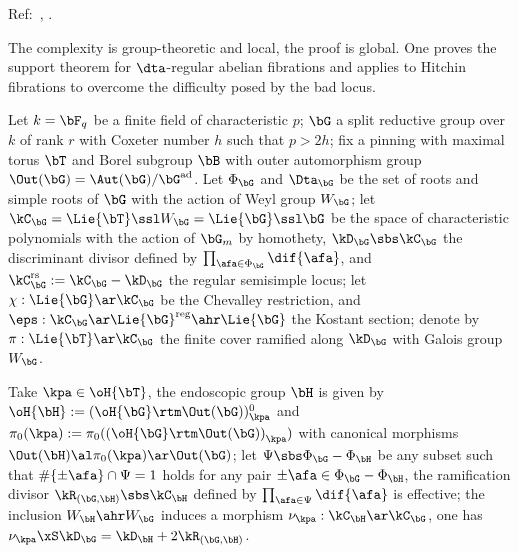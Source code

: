 \documentclass[article, a4paper, twoside]{universal}
\begin{document}
\confighead{}{}{}



Ref:~\cite{Ngo2010Lemme}, \cite{Ngo2006Hitchin,Yun2009Thesis}.

The complexity is group-theoretic and local, the proof is global. One proves the support theorem for $\dta$-regular abelian fibrations and applies to Hitchin fibrations to overcome the difficulty posed by the bad locus.




\begin{stp}
	Let $k=\bF_{q}$ be a finite field of characteristic $p$; $\bG$ a split reductive group over $k$ of rank $r$ with Coxeter number $h$ such that $p>2h$; fix a pinning with maximal torus $\bT$ and Borel subgroup $\bB$ with outer automorphism group $\Out(\bG)=\Aut(\bG)/\bG^{\text{ad}}$. Let $\Phi_{\bG}$ and $\Dta_{\bG}$ be the set of roots and simple roots of $\bG$ with the action of Weyl group $W_{\bG}$; let $\kC_{\bG}=\Lie{\bT}\ssl W_{\bG}=\Lie{\bG}\ssl\bG$ be the space of characteristic polynomials with the action of $\bG_{m}$ by homothety, $\kD_{\bG}\sbs\kC_{\bG}$ the discriminant divisor defined by $\prod_{\afa\in\Phi_{\bG}}\dif{\afa}$, and $\kC_{\bG}^{\text{rs}}:=\kC_{\bG}-\kD_{\bG}$ the regular semisimple locus; let $\chi:\Lie{\bG}\ar\kC_{\bG}$ be the Chevalley restriction, and $\eps:\kC_{\bG}\ar\Lie{\bG}^{\text{reg}}\ahr\Lie{\bG}$ the Kostant section; denote by $\pi:\Lie{\bT}\ar\kC_{\bG}$ the finite cover ramified along $\kD_{\bG}$ with Galois group $W_{\bG}$.

	Take $\kpa\in\oH{\bT}$, the endoscopic group $\bH$ is given by $\oH{\bH}:={(\oH{\bG}\rtm\Out(\bG))}{}_{\kpa}^{0}$ and $\pi_{0}(\kpa):=\pi_{0}({(\oH{\bG}\rtm\Out(\bG))}_{\kpa})$ with canonical morphisms $\Out(\bH)\al\pi_{0}(\kpa)\ar\Out(\bG)$; let $\Psi\sbs\Phi_{\bG}-\Phi_{\bH}$ be any subset such that $\#\{\pm \afa\}\cap\Psi=1$ holds for any pair $\pm \afa\in\Phi_{\bG}-\Phi_{\bH}$, the ramification divisor $\kR_{(\bG,\bH)}\sbs\kC_{\bH}$ defined by $\prod_{\afa\in\Psi}\dif{\afa}$ is effective; the inclusion $W_{\bH}\ahr W_{\bG}$ induces a morphism $\nu_{\kpa}:\kC_{\bH}\ar\kC_{\bG}$, one has $\nu_{\kpa}\xS\kD_{\bG}=\kD_{\bH}+2\kR_{(\bG,\bH)}$.
\end{stp}
\end{document}
